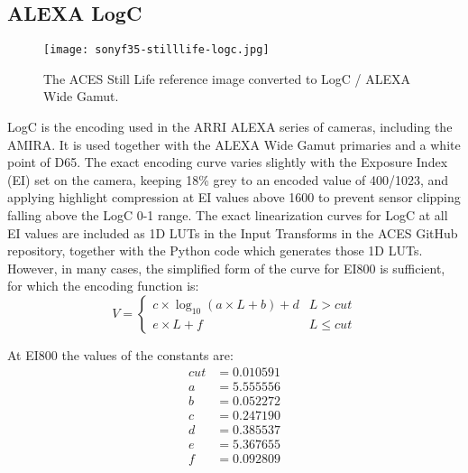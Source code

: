 \subsection{ALEXA LogC}%
\label{subsec:alexa-logc}

\begin{figure}[H]
    \texttt{[image: sonyf35-stilllife-logc.jpg]}
    \caption{
        The ACES Still Life reference image converted to LogC / ALEXA Wide Gamut.\newline
        \ccCopyrightAmpas
    }%
    \label{fig:stilllife-logc}
\end{figure}

LogC is the encoding used in the ARRI ALEXA series of cameras, including the AMIRA.
It is used together with the ALEXA Wide Gamut primaries and a white point of D65.
The exact encoding curve varies slightly with the Exposure Index (EI) set on the camera, keeping 18\% grey to an encoded value of 400/1023, and applying highlight compression at EI values above 1600 to prevent sensor clipping falling above the LogC 0-1 range.
The exact linearization curves for LogC at all EI values are included as 1D LUTs in the Input Transforms in the ACES GitHub repository, together with the Python code which generates those 1D LUTs.
However, in many cases, the simplified form of the curve for EI800 is sufficient, for which the encoding function is:
\begin{equation}
    V =
    \begin{cases}
        c \times \log _{10}(a \times L + b) + d & L > cut \\
         e \times L + f & L \leq cut
    \end{cases}
\end{equation}

At EI800 the values of the constants are:
\begin{align}
    cut &= 0.010591 \nonumber \\
    a &= 5.555556 \nonumber \\
    b &= 0.052272 \nonumber \\
    c &= 0.247190 \nonumber \\
    d &= 0.385537 \nonumber \\
    e &= 5.367655 \nonumber \\
    f &= 0.092809 \nonumber
\end{align}

\begin{figure}[H]
    \label{fig:alexa-logc}
\end{figure}

